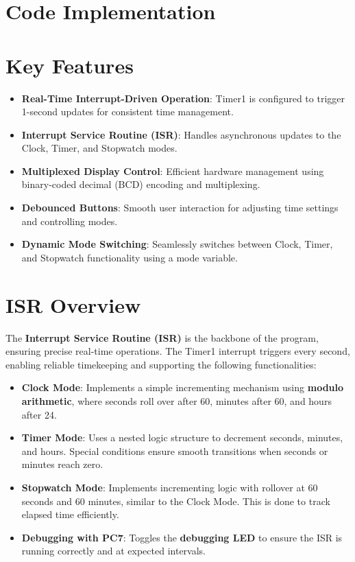 \documentclass[journal]{IEEEtran}
\begin{document}
\section{Code Implementation}
\section*{Key Features}
\begin{itemize}
    \item \textbf{Real-Time Interrupt-Driven Operation}: Timer1 is configured to trigger 1-second updates for consistent time management.
    \item \textbf{Interrupt Service Routine (ISR)}: Handles asynchronous updates to the Clock, Timer, and Stopwatch modes.
    \item \textbf{Multiplexed Display Control}: Efficient hardware management using binary-coded decimal (BCD) encoding and multiplexing.
    \item \textbf{Debounced Buttons}: Smooth user interaction for adjusting time settings and controlling modes.
    \item \textbf{Dynamic Mode Switching}: Seamlessly switches between Clock, Timer, and Stopwatch functionality using a mode variable.
\end{itemize}

\section*{ISR Overview}
The \textbf{Interrupt Service Routine (ISR)} is the backbone of the program, ensuring precise real-time operations. The Timer1 interrupt triggers every second, enabling reliable timekeeping and supporting the following functionalities:
\begin{itemize}
    \item \textbf{Clock Mode}: Implements a simple incrementing mechanism using \textbf{modulo arithmetic}, where seconds roll over after 60, minutes after 60, and hours after 24.
    \item \textbf{Timer Mode}: Uses a nested logic structure to decrement seconds, minutes, and hours. Special conditions ensure smooth transitions when seconds or minutes reach zero.
    \item \textbf{Stopwatch Mode}: Implements incrementing logic with rollover at 60 seconds and 60 minutes, similar to the Clock Mode. This is done to track elapsed time efficiently.
    \item \textbf{Debugging with PC7}: Toggles the \textbf{debugging LED} to ensure the ISR is running correctly and at expected intervals.
\end{itemize}
\end{document}
